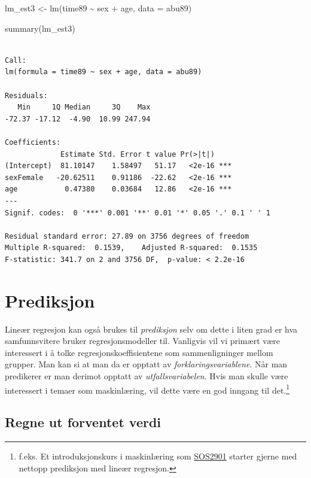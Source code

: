 \documentclass[
  letterpaper,
  DIV=11,
  numbers=noendperiod]{scrreprt}
\newenvironment{Shaded}{\begin{snugshade}}{\end{snugshade}}
\newcommand{\AttributeTok}[1]{\textcolor[rgb]{0.40,0.45,0.13}{#1}}
\newcommand{\FunctionTok}[1]{\textcolor[rgb]{0.28,0.35,0.67}{#1}}
\newcommand{\NormalTok}[1]{\textcolor[rgb]{0.00,0.23,0.31}{#1}}
\newcommand{\OtherTok}[1]{\textcolor[rgb]{0.00,0.23,0.31}{#1}}
\newcommand{\SpecialCharTok}[1]{\textcolor[rgb]{0.37,0.37,0.37}{#1}}
\theoremstyle{definition}
\theoremstyle{remark}
\begin{document}
\begin{Shaded}
\begin{Highlighting}[]
\NormalTok{lm\_est3 }\OtherTok{\textless{}{-}} \FunctionTok{lm}\NormalTok{(time89 }\SpecialCharTok{\textasciitilde{}}\NormalTok{ sex }\SpecialCharTok{+}\NormalTok{ age, }\AttributeTok{data =}\NormalTok{ abu89)}

\FunctionTok{summary}\NormalTok{(lm\_est3)}
\end{Highlighting}
\end{Shaded}

\begin{verbatim}

Call:
lm(formula = time89 ~ sex + age, data = abu89)

Residuals:
   Min     1Q Median     3Q    Max 
-72.37 -17.12  -4.90  10.99 247.94 

Coefficients:
             Estimate Std. Error t value Pr(>|t|)    
(Intercept)  81.10147    1.58497   51.17   <2e-16 ***
sexFemale   -20.62511    0.91186  -22.62   <2e-16 ***
age           0.47380    0.03684   12.86   <2e-16 ***
---
Signif. codes:  0 '***' 0.001 '**' 0.01 '*' 0.05 '.' 0.1 ' ' 1

Residual standard error: 27.89 on 3756 degrees of freedom
Multiple R-squared:  0.1539,    Adjusted R-squared:  0.1535 
F-statistic: 341.7 on 2 and 3756 DF,  p-value: < 2.2e-16
\end{verbatim}

\hypertarget{prediksjon}{%
\section{Prediksjon}\label{prediksjon}}

Lineær regresjon kan også brukes til \emph{prediksjon} selv om dette i
liten grad er hva samfunnsvitere bruker regresjonsmodeller til.
Vanligvis vil vi primært være interessert i å tolke
regresjonskoeffisientene som sammenligninger mellom grupper. Man kan si
at man da er opptatt av \emph{forklaringsvariablene}. Når man predikerer
er man derimot opptatt av \emph{utfallsvariabelen}. Hvis man skulle være
interessert i temaer som maskinlæring, vil dette være en god inngang til
det.\footnote{f.eks. Et introduksjonskurs i maskinlæring som
  \href{https://www.uio.no/studier/emner/sv/iss/SOS2901/index.html}{SOS2901}
  starter gjerne med nettopp prediksjon med lineær regresjon.}

\hypertarget{regne-ut-forventet-verdi}{%
\subsection{Regne ut forventet verdi}\label{regne-ut-forventet-verdi}}
\end{document}
